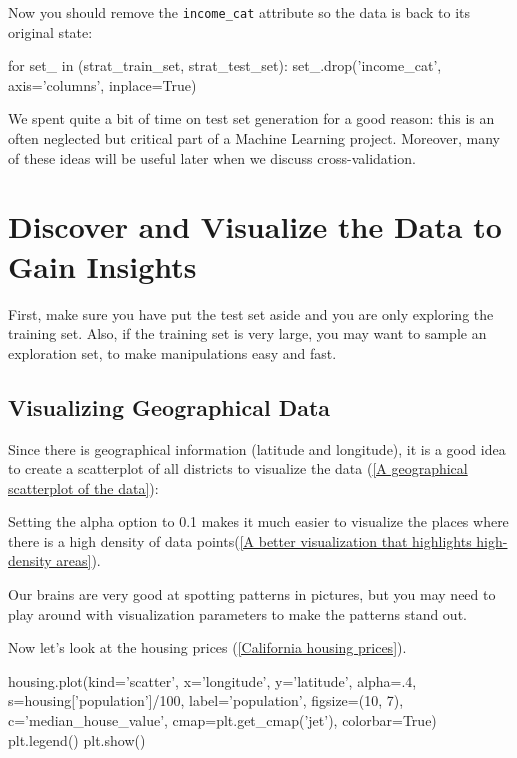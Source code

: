 Now you should remove the \verb|income_cat| attribute so the data is back to its original
state:
\begin{pyc}
for set_ in (strat_train_set, strat_test_set):
    set_.drop('income_cat', axis='columns', inplace=True)
\end{pyc}

We spent quite a bit of time on test set generation for a good reason: this is an often
neglected but critical part of a Machine Learning project. Moreover, many of these
ideas will be useful later when we discuss cross-validation.

\section{Discover and Visualize the Data to Gain Insights}
First, make sure you have put the test set aside and you are only exploring the training set. Also, if the training set is very large, you may want to sample an exploration
set, to make manipulations easy and fast.

\subsection{Visualizing Geographical Data}

Since there is geographical information (latitude and longitude), it is a good idea to
create a scatterplot of all districts to visualize the data (\autoref{A geographical scatterplot of the data}):

Setting the alpha option to 0.1 makes it much easier to visualize the places
where there is a high density of data points(\autoref{A better visualization that highlights high-density areas}).


Our brains are very good at spotting patterns in pictures, but you may need to play
around with visualization parameters to make the patterns stand out.

Now let's look at the housing prices (\autoref{California housing prices}).
\begin{pyc}
housing.plot(kind='scatter', x='longitude', y='latitude', alpha=.4, s=housing['population']/100,
             label='population', figsize=(10, 7),
             c='median_house_value', cmap=plt.get_cmap('jet'), colorbar=True)
plt.legend()
plt.show()
\end{pyc}


